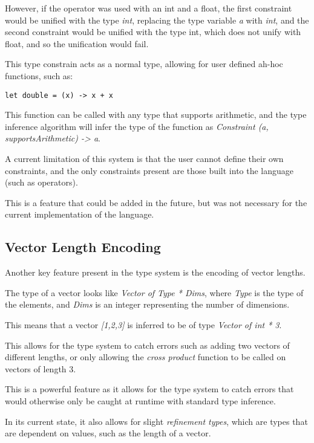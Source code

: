 However, if the operator was used with an int and a float, the first constraint would be unified with the type
\textit{int}, replacing the type variable \textit{a} with \textit{int}, and the second constraint would be unified with 
the type int, which does not unify with float, and so the unification would fail.

This type constrain acts as a normal type, allowing for user defined ah-hoc functions, such as:

\begin{verbatim}
let double = (x) -> x + x
\end{verbatim}

This function can be called with any type that supports arithmetic, and the type inference algorithm will infer the
type of the function as \textit{Constraint (a, supportsArithmetic) -> a}.

A current limitation of this system is that the user cannot define their own constraints, and the only constraints 
present are those built into the language (such as operators).

This is a feature that could be added in the future, but was not necessary for the current implementation of the
language.

\subsection{Vector Length Encoding}\label{subsec:vector-length-enc}

Another key feature present in the type system is the encoding of vector lengths.

The type of a vector looks like \textit{Vector of Type * Dims}, where \textit{Type} is the type of the elements, and \textit{Dims} is an integer representing the number of dimensions.

This means that a vector \textit{[1,2,3]} is inferred to be of type \textit{Vector of int * 3}.

This allows for the type system to catch errors such as adding two vectors of different lengths, or only allowing the \textit{cross product} 
function to be called on vectors of length 3.

This is a powerful feature as it allows for the type system to catch errors that would otherwise only be caught at 
runtime with standard type inference.

In its current state, it also allows for slight \textit{refinement types}\citep{freeman1991refinement}, which are types that are dependent on values, such as the length of a vector.

